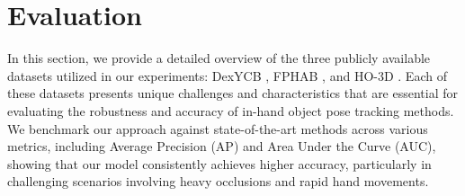 \section{Evaluation}
\label{sec:Evaluation}

In this section, we provide a detailed overview of the three publicly available datasets utilized in our experiments: DexYCB \cite{chao2021dexycb}, FPHAB \cite{garcia2018first}, and HO-3D \cite{hampali2020honnotate}. Each of these datasets presents unique challenges and characteristics that are essential for evaluating the robustness and accuracy of in-hand object pose tracking methods. We benchmark our approach against state-of-the-art methods across various metrics, including Average Precision (AP) and Area Under the Curve (AUC), showing that our model consistently achieves higher accuracy, particularly in challenging scenarios involving heavy occlusions and rapid hand movements.

